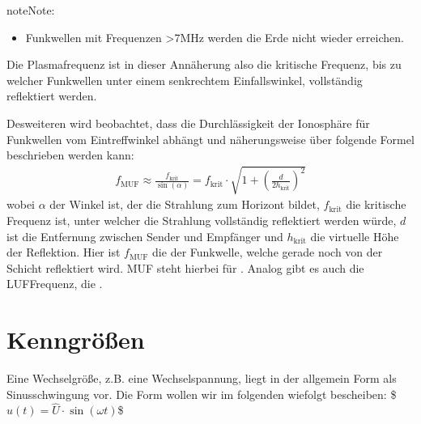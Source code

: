 \documentclass[letterpaper,10pt,english]{jupyterBook}
\begin{document}
\begin{sphinxadmonition}{note}{Note:}
\begin{itemize}
\item {} 
\sphinxAtStartPar
Funkwellen mit Frequenzen >7MHz werden die Erde nicht wieder erreichen.

\end{itemize}

\sphinxAtStartPar
Die Plasmafrequenz ist in dieser Annäherung also die kritische Frequenz, bis zu welcher Funkwellen unter einem senkrechtem Einfallswinkel, vollständig reflektiert werden.

\sphinxAtStartPar
Desweiteren wird beobachtet, dass die Durchlässigkeit der Ionosphäre für Funkwellen vom Eintreffwinkel abhängt und näherungsweise über folgende Formel beschrieben werden kann:
\begin{equation*}
\begin{split}f_\mathrm{MUF} \approx \frac{f_\mathrm{krit}}{\sin(\alpha)} = f_\mathrm{krit} \cdot \sqrt{1 + \left(\frac{d}{2 h_\mathrm{krit}}\right)^2}\end{split}
\end{equation*}
\sphinxAtStartPar
wobei \(\alpha\) der Winkel ist, der die Strahlung zum Horizont bildet, \(f_\mathrm{krit}\) die kritische Frequenz ist, unter welcher die Strahlung vollständig reflektiert werden würde, \(d\) ist die Entfernung zwischen Sender und Empfänger und \(h_\mathrm{krit}\) die virtuelle Höhe der Reflektion. Hier ist \(f_\mathrm{MUF}\) die  der Funkwelle, welche gerade noch von der Schicht reflektiert wird. MUF steht hierbei für . Analog gibt es auch die LUF\sphinxhyphen{}Frequenz, die .
\end{sphinxadmonition}

\sphinxstepscope


\section{Kenngrößen}
\label{\detokenize{content/3_Kenngroessen:kenngroszen}}\label{\detokenize{content/3_Kenngroessen::doc}}
\sphinxAtStartPar
Eine Wechselgröße, z.B. eine Wechselspannung, liegt in der allgemein Form als Sinusschwingung vor. Die Form wollen wir im folgenden wiefolgt bescheiben:
\$\(u(t) = \hat U \cdot \sin(\omega t)\)\$
\end{document}
